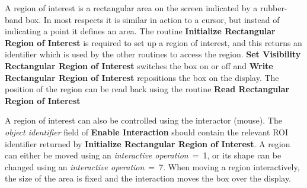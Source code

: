 A region of interest is a rectangular area on the screen indicated by a
rubber-band box. In most respects it is similar in action to a cursor,
but instead of indicating a point it defines an area. The routine
{\bf Initialize Rectangular Region of Interest} is required to set up a
region of interest, and this returns an identifier which is used by the
other routines to access the region. {\bf Set Visibility Rectangular
Region of Interest} switches the box on or off and {\bf Write Rectangular
Region of Interest} repositions the box on the display. The position of
the region can be read back using the routine {\bf Read Rectangular
Region of Interest}

A region of interest can also be controlled using the interactor (mouse).
The {\it object identifier} field of {\bf Enable Interaction} should
contain the relevant ROI identifier returned by {\bf Initialize Rectangular
Region of Interest}. A region can either be moved using an {\it interactive
operation}~=~1, or its shape can be changed using an {\it interactive
operation}~=~7. When moving a region interactively, the size of the area is
fixed and the interaction moves the box over the display.

